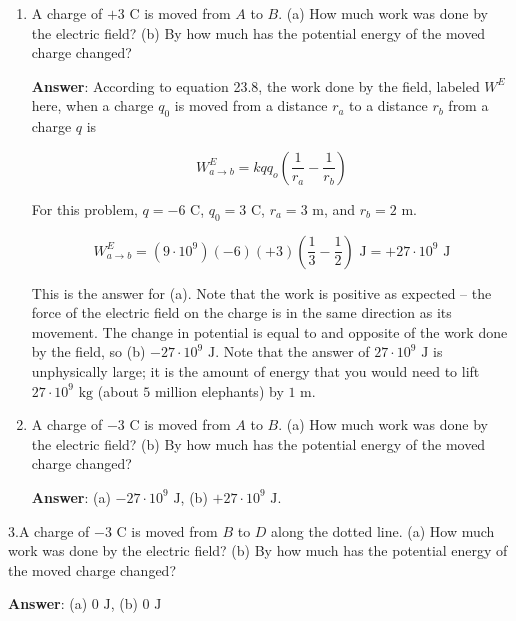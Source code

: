 \documentclass{article}
\begin{document}
\begin{enumerate}

  \item A charge of $+3\text{ C}$ is moved from $A$ to $B$. (a) How much work was done by the electric field? (b) By how much has the potential energy of the moved charge changed?

        \ifsolutions
        {\bf Answer}: According to equation 23.8, the work done by the field, labeled $W^E$ here, when a charge $q_0$ is moved from a distance $r_a$ to a distance $r_b$ from a charge $q$ is

        $$
        W^E_{a\rightarrow b} = kqq_o\left(\frac{1}{r_a}-\frac{1}{r_b}\right)
        $$

        For this problem, $q=-6\text{ C}$, $q_0=3\text{ C}$, $r_a=3\text{ m}$, and $r_b=2\text{ m}$.

        $$
        W^E_{a\rightarrow b} = (9\cdot 10^9)(-6)(+3)\left(\frac{1}{3}-\frac{1}{2}\right)\text{ J} = +27\cdot 10^9\text{ J}
        $$

        This is the answer for (a). Note that the work is positive as expected -- the force of the electric field on the charge is in the same direction as its movement. The change in potential is equal to and opposite of the work done by the field, so (b) $-27\cdot 10^9\text{ J}$. Note that the answer of $27\cdot 10^9\text{ J}$ is unphysically large; it is the amount of energy that you would need to lift $27\cdot 10^9\text{ kg}$ (about $5$ million elephants) by $1\text{ m}$. 
        \else

        \vskip 48pt
        \fi

  \item A charge of $-3\text{ C}$ is moved from $A$ to $B$. (a) How much work was done by the electric field? (b) By how much has the potential energy of the moved charge changed?

        \ifsolutions
        {\bf Answer}: (a) $-27\cdot 10^9\text{ J}$, (b) $+27\cdot 10^9\text{ J}$. 
        \else

        \vskip 48pt
        \fi

\end{enumerate}

3.A charge of $-3\text{ C}$ is moved from $B$ to $D$ along the dotted line. (a) How much work was done by the electric field? (b) By how much has the potential energy of the moved charge changed?

\ifsolutions
{\bf Answer}: (a) $0\text{ J}$, (b) $0\text{ J}$
\else
\end{document}
